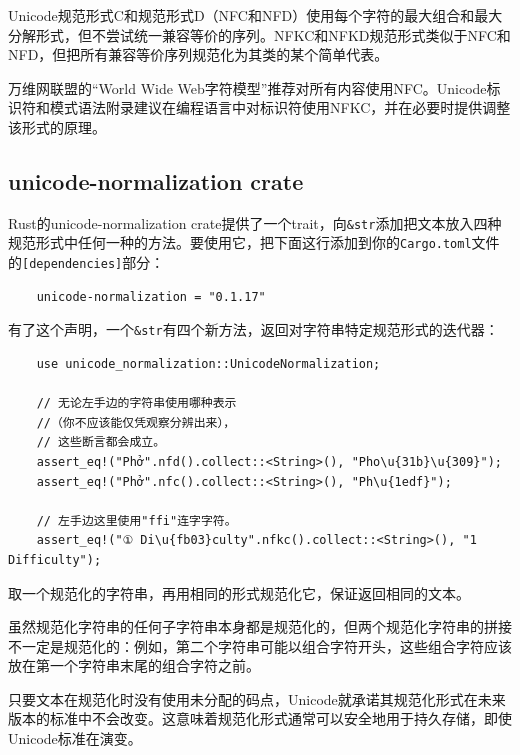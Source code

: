 Unicode规范形式C和规范形式D（NFC和NFD）使用每个字符的最大组合和最大分解形式，但不尝试统一兼容等价的序列。NFKC和NFKD规范形式类似于NFC和NFD，但把所有兼容等价序列规范化为其类的某个简单代表。

万维网联盟的“World Wide Web字符模型”推荐对所有内容使用NFC。Unicode标识符和模式语法附录建议在编程语言中对标识符使用NFKC，并在必要时提供调整该形式的原理。

\subsection{unicode-normalization crate}

Rust的unicode-normalization crate提供了一个trait，向\texttt{\&str}添加把文本放入四种规范形式中任何一种的方法。要使用它，把下面这行添加到你的\texttt{Cargo.toml}文件的\texttt{[dependencies]}部分：
\begin{verbatim}
    unicode-normalization = "0.1.17"
\end{verbatim}

有了这个声明，一个\texttt{\&str}有四个新方法，返回对字符串特定规范形式的迭代器：
\begin{verbatim}
    use unicode_normalization::UnicodeNormalization;

    // 无论左手边的字符串使用哪种表示
    //（你不应该能仅凭观察分辨出来），
    // 这些断言都会成立。
    assert_eq!("Phở".nfd().collect::<String>(), "Pho\u{31b}\u{309}");
    assert_eq!("Phở".nfc().collect::<String>(), "Ph\u{1edf}");

    // 左手边这里使用"ffi"连字字符。
    assert_eq!("① Di\u{fb03}culty".nfkc().collect::<String>(), "1 Difficulty");
\end{verbatim}

取一个规范化的字符串，再用相同的形式规范化它，保证返回相同的文本。

虽然规范化字符串的任何子字符串本身都是规范化的，但两个规范化字符串的拼接不一定是规范化的：例如，第二个字符串可能以组合字符开头，这些组合字符应该放在第一个字符串末尾的组合字符之前。

只要文本在规范化时没有使用未分配的码点，Unicode就承诺其规范化形式在未来版本的标准中不会改变。这意味着规范化形式通常可以安全地用于持久存储，即使Unicode标准在演变。
